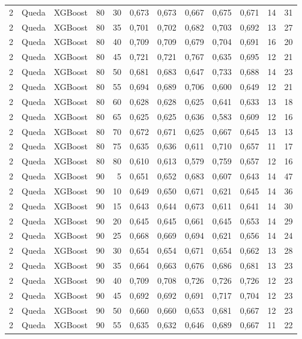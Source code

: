 \begin{longtable}{@{}rllrrrrrrrrr@{}}
2 & Queda & XGBoost & 80 & 30 & 0,673 & 0,673 & 0,667 & 0,675 & 0,671 & 14 & 31 \\
2 & Queda & XGBoost & 80 & 35 & 0,701 & 0,702 & 0,682 & 0,703 & 0,692 & 13 & 27 \\
2 & Queda & XGBoost & 80 & 40 & 0,709 & 0,709 & 0,679 & 0,704 & 0,691 & 16 & 20 \\
2 & Queda & XGBoost & 80 & 45 & 0,721 & 0,721 & 0,767 & 0,635 & 0,695 & 12 & 21 \\
2 & Queda & XGBoost & 80 & 50 & 0,681 & 0,683 & 0,647 & 0,733 & 0,688 & 14 & 23 \\
2 & Queda & XGBoost & 80 & 55 & 0,694 & 0,689 & 0,706 & 0,600 & 0,649 & 12 & 21 \\
2 & Queda & XGBoost & 80 & 60 & 0,628 & 0,628 & 0,625 & 0,641 & 0,633 & 13 & 18 \\
2 & Queda & XGBoost & 80 & 65 & 0,625 & 0,625 & 0,636 & 0,583 & 0,609 & 12 & 16 \\
2 & Queda & XGBoost & 80 & 70 & 0,672 & 0,671 & 0,625 & 0,667 & 0,645 & 13 & 13 \\
2 & Queda & XGBoost & 80 & 75 & 0,635 & 0,636 & 0,611 & 0,710 & 0,657 & 11 & 17 \\
2 & Queda & XGBoost & 80 & 80 & 0,610 & 0,613 & 0,579 & 0,759 & 0,657 & 12 & 16 \\
2 & Queda & XGBoost & 90 & 5 & 0,651 & 0,652 & 0,683 & 0,607 & 0,643 & 14 & 47 \\
2 & Queda & XGBoost & 90 & 10 & 0,649 & 0,650 & 0,671 & 0,621 & 0,645 & 14 & 36 \\
2 & Queda & XGBoost & 90 & 15 & 0,643 & 0,644 & 0,673 & 0,611 & 0,641 & 14 & 30 \\
2 & Queda & XGBoost & 90 & 20 & 0,645 & 0,645 & 0,661 & 0,645 & 0,653 & 14 & 29 \\
2 & Queda & XGBoost & 90 & 25 & 0,668 & 0,669 & 0,694 & 0,621 & 0,656 & 14 & 24 \\
2 & Queda & XGBoost & 90 & 30 & 0,654 & 0,654 & 0,671 & 0,654 & 0,662 & 13 & 28 \\
2 & Queda & XGBoost & 90 & 35 & 0,664 & 0,663 & 0,676 & 0,686 & 0,681 & 13 & 23 \\
2 & Queda & XGBoost & 90 & 40 & 0,709 & 0,708 & 0,726 & 0,726 & 0,726 & 12 & 23 \\
2 & Queda & XGBoost & 90 & 45 & 0,692 & 0,692 & 0,691 & 0,717 & 0,704 & 12 & 23 \\
2 & Queda & XGBoost & 90 & 50 & 0,660 & 0,660 & 0,653 & 0,681 & 0,667 & 12 & 23 \\
2 & Queda & XGBoost & 90 & 55 & 0,635 & 0,632 & 0,646 & 0,689 & 0,667 & 11 & 22 \\

\end{longtable}
